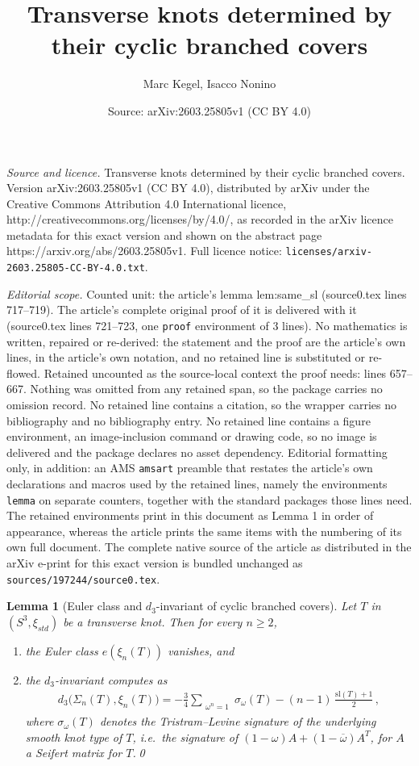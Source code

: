\documentclass[10pt,a4paper]{amsart}
\title{Transverse knots determined by their cyclic branched covers}
\author{Marc Kegel, Isacco Nonino}
\date{Source: arXiv:2603.25805v1 (CC BY 4.0)}
\newtheorem{lemma}{Lemma}
\begin{document}
\maketitle

\noindent\emph{Source and licence.} Transverse knots determined by their cyclic branched covers. Version arXiv:2603.25805v1 (CC BY 4.0), distributed by arXiv under the Creative Commons Attribution 4.0 International licence, http://creativecommons.org/licenses/by/4.0/, as recorded in the arXiv licence metadata for this exact version and shown on the abstract page https://arxiv.org/abs/2603.25805v1. Full licence notice: \texttt{licenses/arxiv-2603.25805-CC-BY-4.0.txt}.\par\smallskip

\noindent\textit{Editorial scope.} Counted unit: the article's lemma lem:same\_sl (source0.tex lines 717--719). The article's complete original proof of it is delivered with it (source0.tex lines 721--723, one \texttt{proof} environment of 3 lines). No mathematics is written, repaired or re-derived: the statement and the proof are the article's own lines, in the article's own notation, and no retained line is substituted or re-flowed.  Retained uncounted as the source-local context the proof needs: lines 657--667.  Nothing was omitted from any retained span, so the package carries no omission record.  No retained line contains a citation, so the wrapper carries no bibliography and no bibliography entry.  No retained line contains a figure environment, an image-inclusion command or drawing code, so no image is delivered and the package declares no asset dependency.  Editorial formatting only, in addition: an AMS \texttt{amsart} preamble that restates the article's own declarations and macros used by the retained lines, namely the environments \texttt{lemma} on separate counters, together with the standard packages those lines need.  The retained environments print in this document as Lemma 1 in order of appearance, whereas the article prints the same items with the numbering of its own full document.  The complete native source of the article as distributed in the arXiv e-print for this exact version is bundled unchanged as \texttt{sources/197244/source0.tex}.
\begin{lemma}[Euler class and $d_3$-invariant of cyclic branched covers]\label{lem:d3}
    Let $T$ in $(S^3,\xi_{std})$ be a transverse knot. Then for every $n\geq2$, 
    \begin{enumerate}
        \item the Euler class $e(\xi_n(T))$ vanishes, and
        \item the $d_3$-invariant computes as
        \begin{align*} d_3\big(\Sigma_n(T),\xi_n(T)\big)=- \frac{3}{4} \sum_{\substack{\omega^n = 1}} \sigma_\omega(T)
- (n-1)\,\frac{\mathrm{sl}(T)+1}{2}\, ,
    \end{align*}
where $\sigma_\omega(T)$ denotes the Tristram--Levine signature of the underlying smooth knot type of $T$, i.e.\ the signature of $(1-\omega)A + (1-\overline{\omega})A^{T}$, for $A$ a Seifert matrix for $T$.\qed
\end{enumerate}
\end{lemma}
\end{document}

